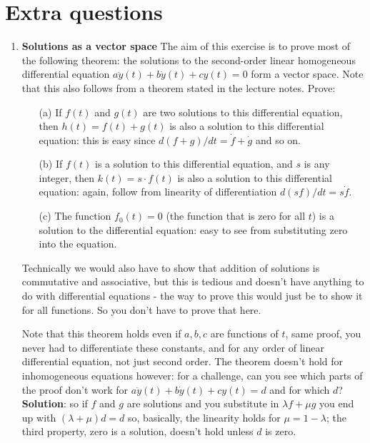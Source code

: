 \documentclass[11pt,a4paper]{scrartcl}
\begin{document}
\section*{Extra questions}
\begin{enumerate}
	\item \textbf{Solutions as a vector space}	
	The aim of this exercise is to prove most of the following theorem:
	the solutions to the second-order linear homogeneous differential equation
	$a\ddot{y}(t) + b\dot{y}(t) + cy(t) = 0$ form a vector space. Note that this also follows from a theorem stated in the lecture notes. Prove:
	\begin{itemize}
		\item[(a)] If $f(t)$ and $g(t)$ are two solutions to this differential equation, then $h(t) = f(t) + g(t)$ is also a solution to this differential equation: this is easy since $d(f+g)/dt=\dot{f}+\dot{g}$ and so on.
		\item[(b)] If $f(t)$ is a solution to this differential equation,
		and $s$ is any integer, then $k(t) = s \cdot f(t)$ is also a solution to this differential equation: again, follow from linearity of differentiation $d(sf)/dt=s\dot{f}$.
		\item[(c)] The function $f_0(t) = 0$ (the function that is zero for all $t$) is a solution to the differential equation: easy to see from substituting zero into the equation.
	\end{itemize}
	Technically we would also have to show that addition of
        solutions is commutative and associative, but this is tedious
        and doesn't have anything to do with differential equations -
        the way to prove this would just be to show it for all
        functions. So you don't have to prove that here.
	
	Note that this theorem holds even if $a,b,c$ are functions of
        $t$, same proof, you never had to differentiate these
        constants, and for any order of linear differential equation,
        not just second order. The theorem doesn't hold for
        inhomogeneous equations however: for a challenge, can
        you see which parts of the proof don't work for $a\ddot{y}(t) +
        b\dot{y}(t) + cy(t) = d$ and for which $d$? \textbf{Solution}: so if $f$ and $g$ are solutions and you substitute in $\lambda f+\mu g$ you end up with $(\lambda +\mu)d=d$ so, basically, the linearity holds for $\mu=1-\lambda$; the third property, zero is a solution, doesn't hold unless $d$ is zero. 
	




          
        
\end{enumerate}
\end{document}
